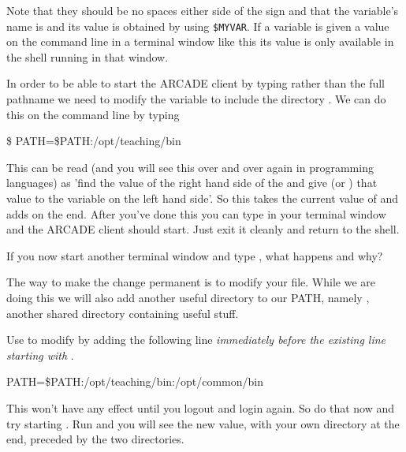 Note that they should be no spaces either side of the \ttout{=} sign and that the variable's name is  and its value is obtained  by using \verb+$MYVAR+. If a variable is given a value on the command line in a terminal window like this its value is only available in the shell running in that window.

In order to be able to start the ARCADE client by typing  rather than the full pathname  we need to modify the  variable to include the directory . We can do this on the command line by typing

\begin{ttoutenv}
\$ PATH=\$PATH:/opt/teaching/bin
\end{ttoutenv}

This can be read (and you will see this over and over again in
programming languages) as 'find the value of the right hand side of
the \ttout{=} and give (or ) that value to the variable on the left hand side'. So this takes the current value of  and adds
 on the end. After you've done this you can
type  in your terminal window and the ARCADE client
should start. Just exit it cleanly and return to the shell.


If you now start another terminal window and type , what happens and why?

The way to make the change permanent is to modify your
 file. While we are doing this we will also add
another useful directory to our PATH, namely ,
another shared directory containing useful stuff.

Use  to modify   by adding the following line \emph{immediately before the existing line starting with }.

\begin{ttoutenv}
PATH=\$PATH:/opt/teaching/bin:/opt/common/bin
\end{ttoutenv}


This won't have any effect until you logout and login again. So do that now and try starting . Run  and you will see the new value, with your own  directory at the end, preceded by the two  directories.

